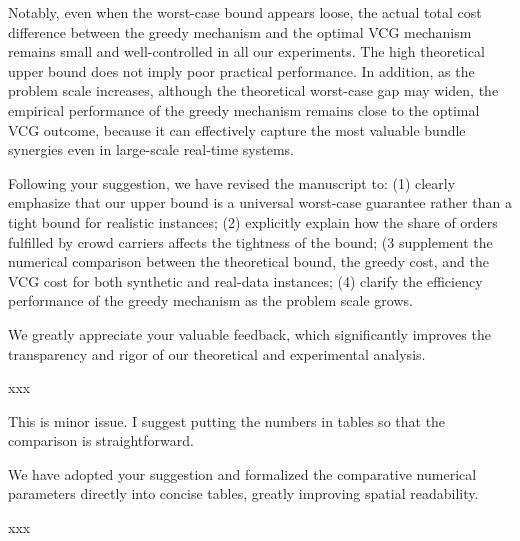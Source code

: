 \begin{revresponse}[1.3.2]
    Notably, even when the worst-case bound appears loose, the actual total cost difference between the greedy mechanism and the optimal VCG mechanism remains small and well-controlled in all our experiments. The high theoretical upper bound does not imply poor practical performance. In addition, as the problem scale increases, although the theoretical worst-case gap may widen, the empirical performance of the greedy mechanism remains close to the optimal VCG outcome, because it can effectively capture the most valuable bundle synergies even in large-scale real-time systems. 
    
    Following your suggestion, we have revised the manuscript to: (1) clearly emphasize that our upper bound is a universal worst-case guarantee rather than a tight bound for realistic instances; (2) explicitly explain how the share of orders fulfilled by crowd carriers affects the tightness of the bound; (3 supplement the numerical comparison between the theoretical bound, the greedy cost, and the VCG cost for both synthetic and real-data instances; (4) clarify the efficiency performance of the greedy mechanism as the problem scale grows.

    We greatly appreciate your valuable feedback, which significantly improves the transparency and rigor of our theoretical and experimental analysis.
    \begin{changes}
        xxx
    \end{changes}
\end{revresponse}


\begin{revcomment}[1.4]
	This is minor issue. I suggest putting the numbers in tables so that the comparison is straightforward. 
\end{revcomment}

\begin{revresponse}[1.4]
	We have adopted your suggestion and formalized the comparative numerical parameters directly into concise tables, greatly improving spatial readability.
    \begin{changes}
        xxx
    \end{changes}
\end{revresponse}
